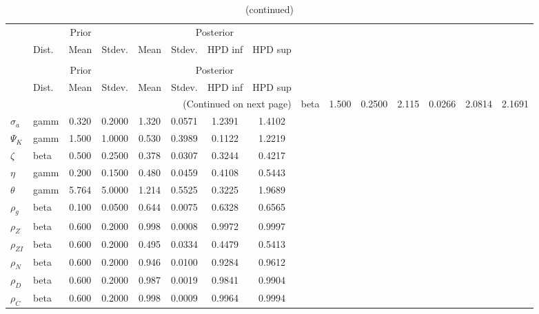 
\begin{center}
\begin{longtable}{llcccccc} 
\caption{Results from Metropolis-Hastings (parameters)}
 \label{Table:MHPosterior:1}\\
\toprule 
  & \multicolumn{3}{c}{Prior}  &  \multicolumn{4}{c}{Posterior} \\
  \cmidrule(r{.75em}){2-4} \cmidrule(r{.75em}){5-8}
  & Dist. & Mean  & Stdev. & Mean & Stdev. & HPD inf & HPD sup\\
\midrule \endfirsthead 
\caption{(continued)}\\\toprule 
  & \multicolumn{3}{c}{Prior}  &  \multicolumn{4}{c}{Posterior} \\
  \cmidrule(r{.75em}){2-4} \cmidrule(r{.75em}){5-8}
  & Dist. & Mean  & Stdev. & Mean & Stdev. & HPD inf & HPD sup\\
\midrule \endhead 
\bottomrule \multicolumn{8}{r}{(Continued on next page)} \endfoot 
\bottomrule \endlastfoot 
${\gamma}$ & beta &   1.500 & 0.2500 &   2.115& 0.0266 &  2.0814 &  2.1691 \\ 
${\sigma_a}$ & gamm &   0.320 & 0.2000 &   1.320& 0.0571 &  1.2391 &  1.4102 \\ 
${\Psi_K}$ & gamm &   1.500 & 1.0000 &   0.530& 0.3989 &  0.1122 &  1.2219 \\ 
${\zeta}$ & beta &   0.500 & 0.2500 &   0.378& 0.0307 &  0.3244 &  0.4217 \\ 
${\eta}$ & gamm &   0.200 & 0.1500 &   0.480& 0.0459 &  0.4108 &  0.5443 \\ 
${\theta}$ & gamm &   5.764 & 5.0000 &   1.214& 0.5525 &  0.3225 &  1.9689 \\ 
${\rho_g}$ & beta &   0.100 & 0.0500 &   0.644& 0.0075 &  0.6328 &  0.6565 \\ 
${\rho_Z}$ & beta &   0.600 & 0.2000 &   0.998& 0.0008 &  0.9972 &  0.9997 \\ 
${\rho_{ZI}}$ & beta &   0.600 & 0.2000 &   0.495& 0.0334 &  0.4479 &  0.5413 \\ 
${\rho_N}$ & beta &   0.600 & 0.2000 &   0.946& 0.0100 &  0.9284 &  0.9612 \\ 
${\rho_D}$ & beta &   0.600 & 0.2000 &   0.987& 0.0019 &  0.9841 &  0.9904 \\ 
${\rho_C}$ & beta &   0.600 & 0.2000 &   0.998& 0.0009 &  0.9964 &  0.9994 \\ 
\end{longtable}
 \end{center}
